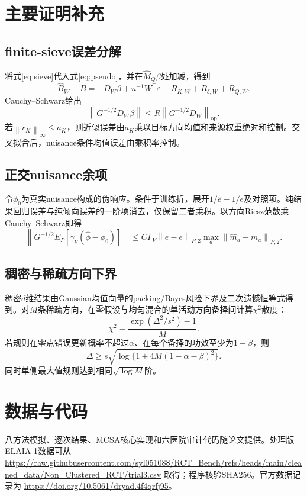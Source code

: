 \documentclass[UTF8,12pt]{ctexart}
\newcommand{\norm}[1]{\left\lVert #1\right\rVert}
\newcommand{\op}{\mathrm{op}}
\begin{document}
\appendix
\section{主要证明补充}
\subsection{finite-sieve误差分解}
将式\eqref{eq:sieve}代入式\eqref{eq:pseudo}，并在$\widehat M_Q\beta$处加减，得到
\[
\widehat B_W-B
=-D_W\beta+n^{-1}W^\top\varepsilon+R_{K,W}+R_{\delta,W}+R_{Q,W}.
\]
Cauchy--Schwarz给出
\[
\norm{G^{-1/2}D_W\beta}
\le R\norm{G^{-1/2}D_W}_{\op}.
\]
若$\norm{r_K}_\infty\le a_K$，则近似误差由$a_K$乘以目标方向均值和来源权重绝对和控制。交叉拟合后，nuisance条件均值误差由乘积率控制。

\subsection{正交nuisance余项}
令$\phi_0$为真实nuisance构成的伪响应。条件于训练折，展开$1/\widehat e-1/e$及对照项。纯结果回归误差与纯倾向误差的一阶项消去，仅保留二者乘积。以方向Riesz范数乘Cauchy--Schwarz即得
\[
\norm{G^{-1/2}E_P[\widehat\gamma_V(\widehat\phi-\phi_0)]}
\le C\Gamma_V
\norm{\widehat e-e}_{P,2}
\max_a\norm{\widehat m_a-m_a}_{P,2}.
\]

\subsection{稠密与稀疏方向下界}
稠密$d$维结果由Gaussian均值向量的packing/Bayes风险下界及二次遗憾恒等式得到。对$M$条稀疏方向，在零假设与均匀混合的单活动方向备择间计算$\chi^2$散度：
\[
\chi^2=\frac{\exp(\Delta^2/s^2)-1}{M}.
\]
若规则在零点错误更新概率不超过$\alpha$、在每个备择的功效至少为$1-\beta$，则
\[
\Delta\ge s\sqrt{\log\{1+4M(1-\alpha-\beta)^2\}}.
\]
同时单侧最大值规则达到相同$\sqrt{\log M}$阶。

\section*{数据与代码}
八方法模拟、逐次结果、MCSA核心实现和六医院审计代码随论文提供。处理版ELAIA-1数据可从
\url{https://raw.githubusercontent.com/syl051088/RCT_Bench/refs/heads/main/cleaned_data/Non_Clustered_RCT/trial3.csv}
取得；程序核验SHA256。官方数据记录为
\url{https://doi.org/10.5061/dryad.4f4qrfj95}。
\end{document}
